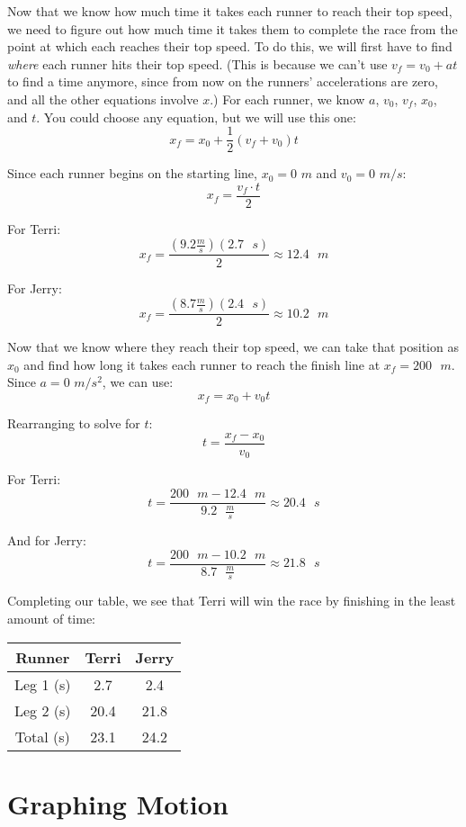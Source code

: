Now that we know how much time it takes each runner to reach their top speed, we 
need to figure out how much time it takes them to complete the race from the 
point at which each reaches their top speed. To do this, we will first have to 
find \textit{where} each runner hits their top speed. (This is because we can't 
use $v_f = v_0 + at$ to find a time anymore, since from now on the runners' 
accelerations are zero, and all the other equations involve $x$.) For each 
runner, we know $a$, $v_0$, $v_f$, $x_0$, and $t$. You could choose any equation, 
but we will use this one:
$$x_f = x_0 + \frac{1}{2} \left( v_f + v_0 \right)t$$

Since each runner begins on the starting line, $x_0 = 0$ $m$ and $v_0 = 0$ $m/s$:
$$x_f = \frac{v_f \cdot t}{2}$$

For Terri:
$$x_f = \frac{\left(9.2 \frac{m}{s} \right) \left(2.7\text{ }s \right)}{2} 
\approx 12.4 \text{ }m$$

For Jerry:
$$x_f = \frac{\left( 8.7 \frac{m}{s} \right) \left( 2.4 \text{ }s \right)}{2} 
\approx 10.2 \text{ }m$$

Now that we know where they reach their top speed, we can take that position as 
$x_0$ and find how long it takes each runner to reach the finish line at $x_f = 
200\text{ }m$. Since $a = 0$ $m/s^2$, we can use:
$$x_f = x_0 + v_0 t$$

Rearranging to solve for $t$:
$$t = \frac{x_f - x_0}{v_0}$$

For Terri:
$$t = \frac{200 \text{ } m - 12.4 \text{ } m}{9.2 \text{ } \frac{m}{s}} \approx 
20.4\text{ }s$$

And for Jerry:
$$t = \frac{200 \text{ } m - 10.2 \text{ } m}{8.7 \text{ } \frac{m}{s}} \approx 
21.8 \text{ } s$$

Completing our table, we see that Terri will win the race by finishing in the 
least amount of time:
\begin{center}
\begin{tabular}{|c|c|c|}
\hline
Runner & Terri & Jerry\\\hline
Leg 1 (s) & 2.7 & 2.4 \\\hline
Leg 2 (s) & 20.4 & 21.8 \\\hline
Total (s) & 23.1 & 24.2 \\\hline
\end{tabular}
\end{center}

\section{Graphing Motion}

